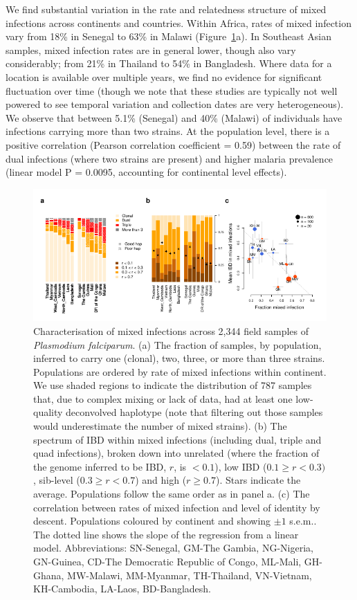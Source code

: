 \documentclass[9pt,lineno]{elife}
\begin{document}
We find substantial variation in the rate and relatedness structure of mixed infections across continents and countries.  Within Africa, rates of mixed infection vary from 18\% in Senegal to 63\% in Malawi (Figure~\ref{fig:mixInfPlot}a). In Southeast Asian samples, mixed infection rates are in general lower, though also vary considerably; from 21\% in Thailand to 54\% in Bangladesh.  Where data for a location is available over multiple years, we find no evidence for significant fluctuation over time (though we note that these studies are typically not well powered to see temporal variation and collection dates are very heterogeneous). We observe that between 5.1\% (Senegal) and 40\% (Malawi) of individuals have infections carrying more than two strains. At the population level, there is a positive correlation (Pearson correlation coefficient = 0.59) between the rate of dual infections (where two strains are present) and higher malaria prevalence (linear model P = 0.0095, accounting for continental level effects).

\begin{figure}[h]
  \begin{center}
    \includegraphics[width=\textwidth]{Fig3.pdf}
    \caption{Characterisation of mixed infections across 2,344 field samples of {\it Plasmodium falciparum}. (a) The fraction of samples, by population, inferred to carry one (clonal), two, three, or more than three strains.  Populations are ordered by rate of mixed infections within continent. We use shaded regions to indicate the distribution of 787 samples that, due to complex mixing or lack of data, had at least one low-quality deconvolved haplotype (note that filtering out those samples would underestimate the number of mixed strains). (b) The spectrum of IBD within mixed infections (including dual, triple and quad infections), broken down into unrelated (where the fraction of the genome inferred to be IBD, $r$, is $< 0.1$), low IBD ($0.1 \geq r < 0.3)$, sib-level ($0.3 \geq r<0.7$) and high ($r \geq 0.7$). Stars indicate the average.  Populations follow the same order as in panel a.  (c) The correlation between rates of mixed infection and level of identity by descent. Populations coloured by continent and showing $\pm 1$ s.e.m..  The dotted line shows the slope of the regression from a linear model.  Abbreviations: SN-Senegal, GM-The Gambia, NG-Nigeria, GN-Guinea, CD-The Democratic Republic of Congo, ML-Mali, GH-Ghana, MW-Malawi, MM-Myanmar, TH-Thailand, VN-Vietnam, KH-Cambodia, LA-Laos, BD-Bangladesh.} \label{fig:mixInfPlot}
  \end{center}
\end{figure}
\end{document}
